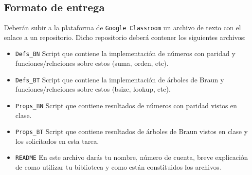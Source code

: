 \documentclass[letterpaper, 11 pt]{article}
\begin{document}








\subsection*{Formato de entrega}
Deberán subir a la plataforma de {\tt Google Classroom} un archivo de texto con el enlace a un repositorio. Dicho repositorio deberá  contener los siguientes archivos:
\begin{itemize}
    \item {\tt Defs\_BN} Script que contiene la implementación de números con paridad y funciones/relaciones sobre estos (suma, orden, etc).
    \item {\tt Defs\_BT} Script que contiene la implementación de árboles de Braun y funciones/relaciones sobre estos (bsize, lookup, etc).
    \item {\tt Props\_BN} Script que contiene resultados de números con paridad vistos en clase.
    \item {\tt Props\_BT} Script que contiene resultados de árboles de Braun vistos en clase y los solicitados en esta tarea.
    \item {\tt README} En este archivo darás tu nombre, número de cuenta, breve explicación de como utilizar tu biblioteca y como  están constituidos los archivos.
\end{itemize}
\end{document}
